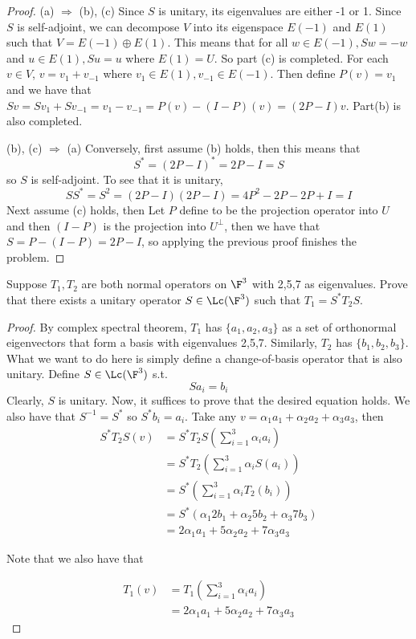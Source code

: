 \documentclass{extarticle}
\begin{document}
\begin{proof}
(a) \(\Rightarrow\) (b), (c) Since \(S\) is unitary, its eigenvalues are either -1 or 1. Since
\(S\) is self-adjoint, we can decompose \(V\) into its eigenspace \(E(-1)\) and
\(E(1)\) such that \(V = E(-1) \oplus E(1)\). This means that for all \(w \in E(-1),
Sw = - w\) and \(u \in E(1), S u = u\) where \(E(1) = U\). So part (c) is completed. For
each \(v \in V\), \(v = v_1 + v_{-1}\) where \(v_1 \in E(1), v_{-1} \in E(-1)\). Then define
\(P(v) = v_1\) and we have that \(Sv = Sv_1 + S v_{-1} = v_1 - v_{-1} = P(v) - (I - P)(v)
= (2P - I) v\). Part(b) is also completed.

(b), (c) \(\Rightarrow\) (a) Conversely, first assume (b) holds, then this means that
\[S^* = (2P - I)^* = 2P - I = S\]
so \(S\) is self-adjoint. To see that it is unitary,
\[SS^* = S^2 = (2P - I)(2P - I) = 4P^2 - 2P - 2P + I = I\]
Next assume (c) holds, then Let \(P\) define to be the projection operator into \(U\) and then
\((I - P)\) is the projection into \(U^\perp\), then we have that \(S = P - (I - P) = 2P - I\), so
applying the previous proof finishes the problem.
\end{proof}

\begin{problem}{6}
    Suppose \(T_1, T_2\) are both normal operators on \(\F^3\) with 2,5,7 as eigenvalues. Prove
    that there exists a unitary operator \(S \in \Lc(\F^3)\) such that \(T_1 = S^* T_2 S\).
\end{problem}

\begin{proof}
By complex spectral theorem, \(T_1\) has \(\{a_1, a_2, a_3\}\) as a set of orthonormal eigenvectors that
form a basis with eigenvalues 2,5,7. Similarly, \(T_2\) has \(\{b_1, b_2, b_3\}\). What we want to
do here is simply define a change-of-basis operator that is also unitary. Define \(S \in \Lc(\F^3)\) s.t.
\[S a_i = b_i\]
Clearly, \(S\) is unitary. Now, it suffices to prove that the desired equation holds.
We also have that \(S^{-1} = S^* \) so \(S^* b_i = a_i\). Take any
\(v = \alpha_1 a_1 + \alpha_2 a_2 + \alpha_3 a_3\), then
\begin{align*}
    S^*T_2S (v)
    &= S^*T_2 S \left(\sum_{i=1}^{3} \alpha_i a_i \right) \\
    &= S^*T_2 \left( \sum_{i=1}^{3} \alpha_i S(a_i) \right) \\
    &= S^* \left(\sum_{i=1}^{3} \alpha_i T_2(b_i) \right) \\
    &= S^* (\alpha_1 2b_1 + \alpha_2 5b_2 + \alpha_3 7b_3) \\
    &= 2 \alpha_1 a_1 + 5 \alpha_2 a_2 + 7 \alpha_3 a_3
\end{align*}

Note that we also have that

\begin{align*}
    T_1 (v)
    &= T_1 \left(\sum_{i=1}^{3} \alpha_i a_i \right) \\
    &= 2\alpha_1 a_1 + 5 \alpha_2 a_2 + 7 \alpha_3 a_3
\end{align*}
\end{proof}
\end{document}
